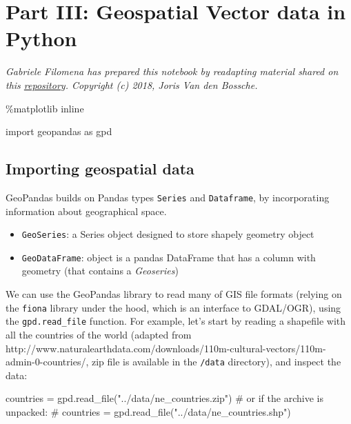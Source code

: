 \documentclass[
  letterpaper,
  DIV=11,
  numbers=noendperiod]{scrreprt}
\newenvironment{Shaded}{\begin{snugshade}}{\end{snugshade}}
\newcommand{\CommentTok}[1]{\textcolor[rgb]{0.37,0.37,0.37}{#1}}
\newcommand{\ImportTok}[1]{\textcolor[rgb]{0.00,0.46,0.62}{#1}}
\newcommand{\NormalTok}[1]{\textcolor[rgb]{0.00,0.23,0.31}{#1}}
\newcommand{\OperatorTok}[1]{\textcolor[rgb]{0.37,0.37,0.37}{#1}}
\newcommand{\StringTok}[1]{\textcolor[rgb]{0.13,0.47,0.30}{#1}}
\providecommand{\tightlist}{%
  \setlength{\itemsep}{0pt}\setlength{\parskip}{0pt}}\usepackage{longtable,booktabs,array}
\begin{document}
\hypertarget{part-iii-geospatial-vector-data-in-python}{%
\section{Part III: Geospatial Vector data in
Python}\label{part-iii-geospatial-vector-data-in-python}}

\emph{Gabriele Filomena has prepared this notebook by readapting
material shared on this
\href{https://github.com/jorisvandenbossche/geopandas-tutorial}{repository}.
Copyright (c) 2018, Joris Van den Bossche.}

\begin{Shaded}
\begin{Highlighting}[]
\OperatorTok{\%}\NormalTok{matplotlib inline}

\ImportTok{import}\NormalTok{ geopandas }\ImportTok{as}\NormalTok{ gpd}
\end{Highlighting}
\end{Shaded}

\hypertarget{importing-geospatial-data}{%
\subsection{Importing geospatial data}\label{importing-geospatial-data}}

GeoPandas builds on Pandas types \texttt{Series} and \texttt{Dataframe},
by incorporating information about geographical space.

\begin{itemize}
\tightlist
\item
  \texttt{GeoSeries}: a Series object designed to store shapely geometry
  object
\item
  \texttt{GeoDataFrame}: object is a pandas DataFrame that has a column
  with geometry (that contains a \emph{Geoseries})
\end{itemize}

We can use the GeoPandas library to read many of GIS file formats
(relying on the \texttt{fiona} library under the hood, which is an
interface to GDAL/OGR), using the \texttt{gpd.read\_file} function. For
example, let's start by reading a shapefile with all the countries of
the world (adapted from
http://www.naturalearthdata.com/downloads/110m-cultural-vectors/110m-admin-0-countries/,
zip file is available in the \texttt{/data} directory), and inspect the
data:

\begin{Shaded}
\begin{Highlighting}[]
\NormalTok{countries }\OperatorTok{=}\NormalTok{ gpd.read\_file(}\StringTok{"../data/ne\_countries.zip"}\NormalTok{)}
\CommentTok{\# or if the archive is unpacked:}
\CommentTok{\# countries = gpd.read\_file("../data/ne\_countries.shp")}
\end{Highlighting}
\end{Shaded}
\end{document}
